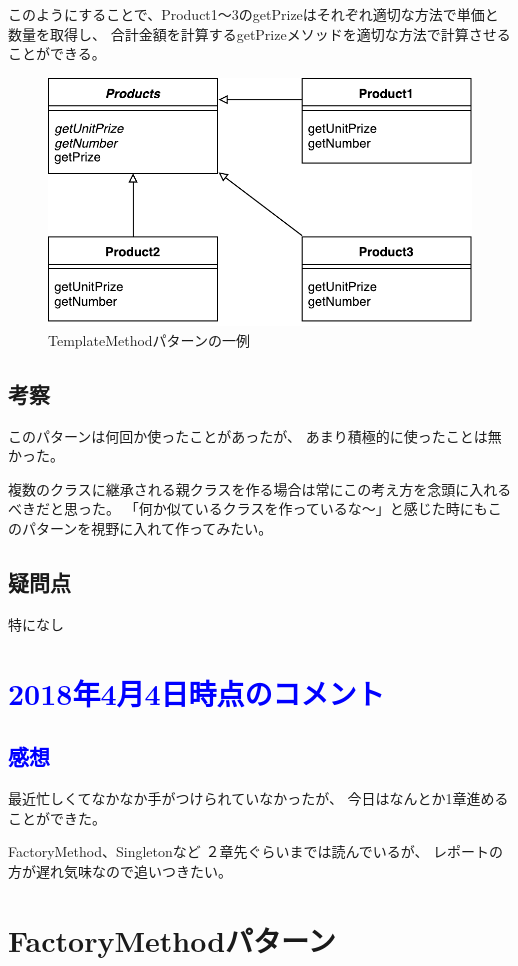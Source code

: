 \documentclass[11pt]{jsarticle}
\begin{document}
			このようにすることで、Product1〜3のgetPrizeはそれぞれ適切な方法で単価と数量を取得し、
			合計金額を計算するgetPrizeメソッドを適切な方法で計算させることができる。
			
			\begin{figure}[htbp]
				\centering
				\includegraphics[width = 0.5\hsize]{TemplateMethodPattern.pdf}
				\caption{TemplateMethodパターンの一例}
				\label{fig::TemplateMethod1}
			\end{figure}
			
		\subsection{考察}
			このパターンは何回か使ったことがあったが、
			あまり積極的に使ったことは無かった。
			
			複数のクラスに継承される親クラスを作る場合は常にこの考え方を念頭に入れるべきだと思った。
			「何か似ているクラスを作っているな〜」と感じた時にもこのパターンを視野に入れて作ってみたい。
		
		\color{red}
		\subsection{疑問点}
			特になし
		\color{black}
		
		\section*{\textcolor{blue}{2018年4月4日時点のコメント}}
		\subsection*{\textcolor{blue}{感想}}
			最近忙しくてなかなか手がつけられていなかったが、
			今日はなんとか1章進めることができた。
			
			FactoryMethod、Singletonなど
			２章先ぐらいまでは読んでいるが、
			レポートの方が遅れ気味なので追いつきたい。
			\clearpage
			
		\section{FactoryMethodパターン}
\end{document}
